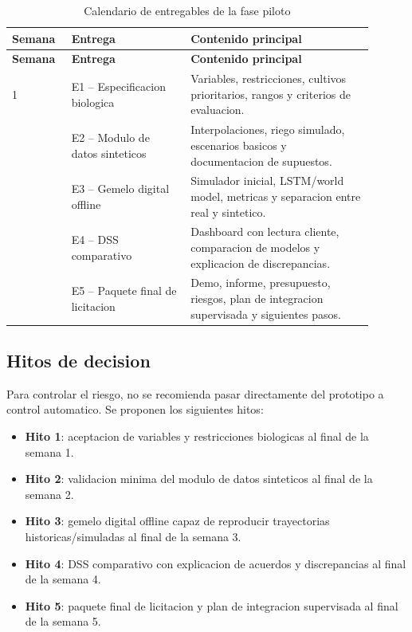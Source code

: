 ﻿\documentclass[11pt,a4paper]{article}
\begin{document}
\begin{longtable}{p{0.14\linewidth}p{0.30\linewidth}p{0.46\linewidth}}
\caption{Calendario de entregables de la fase piloto}\\
\toprule
\textbf{Semana} & \textbf{Entrega} & \textbf{Contenido principal} \\
\midrule
\endfirsthead
\toprule
\textbf{Semana} & \textbf{Entrega} & \textbf{Contenido principal} \\
\midrule
\endhead
1 & E1 -- Especificacion biologica & Variables, restricciones, cultivos prioritarios, rangos y criterios de evaluacion. \\ \addlinespace
2 & E2 -- Modulo de datos sinteticos & Interpolaciones, riego simulado, escenarios basicos y documentacion de supuestos. \\ \addlinespace
3 & E3 -- Gemelo digital offline & Simulador inicial, LSTM/world model, metricas y separacion entre real y sintetico. \\ \addlinespace
4 & E4 -- DSS comparativo & Dashboard con lectura cliente, comparacion de modelos y explicacion de discrepancias. \\ \addlinespace
5 & E5 -- Paquete final de licitacion & Demo, informe, presupuesto, riesgos, plan de integracion supervisada y siguientes pasos. \\
\bottomrule
\end{longtable}

\subsection{Hitos de decision}

Para controlar el riesgo, no se recomienda pasar directamente del prototipo a control automatico. Se proponen los siguientes hitos:

\begin{itemize}
    \item \textbf{Hito 1}: aceptacion de variables y restricciones biologicas al final de la semana 1.
    \item \textbf{Hito 2}: validacion minima del modulo de datos sinteticos al final de la semana 2.
    \item \textbf{Hito 3}: gemelo digital offline capaz de reproducir trayectorias historicas/simuladas al final de la semana 3.
    \item \textbf{Hito 4}: DSS comparativo con explicacion de acuerdos y discrepancias al final de la semana 4.
    \item \textbf{Hito 5}: paquete final de licitacion y plan de integracion supervisada al final de la semana 5.
\end{itemize}
\end{document}
